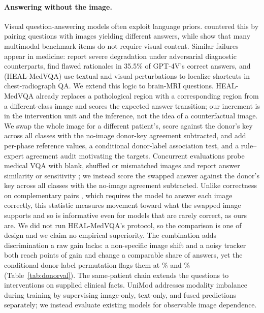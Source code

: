 \documentclass[conference]{IEEEtran}
\begin{document}
\paragraph{Answering without the image.} Visual question-answering models often exploit language priors. \citet{goyal2017making} countered this by pairing questions with images yielding different answers, while \citet{chen2024right} show that many multimodal benchmark items do not require visual content. Similar failures appear in medicine: \citet{yan2025worse} report severe degradation under adversarial diagnostic counterparts, \citet{jin2024hidden} find flawed rationales in 35.5\% of GPT-4V's correct answers, and \citet{nguyen2025localizing} (HEAL-MedVQA) use textual and visual perturbations to localize shortcuts in chest-radiograph QA. We extend this logic to brain-MRI questions. HEAL-MedVQA \citep{nguyen2025localizing} already replaces a pathological region with a corresponding region from a different-class image and scores the expected answer transition; our increment is in the intervention unit and the inference, not the idea of a counterfactual image. We swap the whole image for a different patient's, score against the donor's key across all classes with the no-image donor-key agreement subtracted, and add per-phase reference values, a conditional donor-label association test, and a rule--expert agreement audit motivating the targets. Concurrent evaluations probe medical VQA with blank, shuffled or mismatched images and report answer similarity or sensitivity \citep{zafar2026beyond, zhu2026ask4vg}; we instead score the swapped answer against the donor's key across all classes with the no-image agreement subtracted. Unlike correctness on complementary pairs \citep{goyal2017making}, which requires the model to answer each image correctly, this statistic measures movement toward what the swapped image supports and so is informative even for models that are rarely correct, as ours are. We did not run HEAL-MedVQA's protocol, so the comparison is one of design and we claim no empirical superiority. The combination adds discrimination a raw gain lacks: a non-specific image shift and a noisy tracker both reach \vfourDonorValShiftGain{} points of gain and change a comparable share of answers, yet the conditional donor-label permutation flags them at \vfourDonorValShiftDetect{}\% and \vfourDonorValTrackLowDetect{}\% (Table~\ref{tab:donorval}). The same-patient chain extends the questions to interventions on supplied clinical facts. UniMod \citep{gu2026unimod} addresses modality imbalance during training by supervising image-only, text-only, and fused predictions separately; we instead evaluate existing models for observable image dependence.
\end{document}
